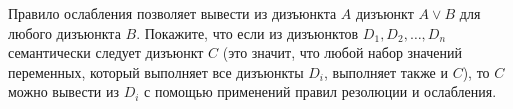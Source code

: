 Правило ослабления позволяет вывести из дизъюнкта $A$ дизъюнкт $A \lor B$ для любого дизъюнкта
$B$. Покажите, что если из дизъюнктов $D_1, D_2, \dots, D_n$ семантически следует дизъюнкт $C$ (это
значит, что любой набор значений переменных, который выполняет все дизъюнкты $D_i$, выполняет также и
$C$), то $C$ можно вывести из $D_i$ с помощью применений правил резолюции и ослабления.
